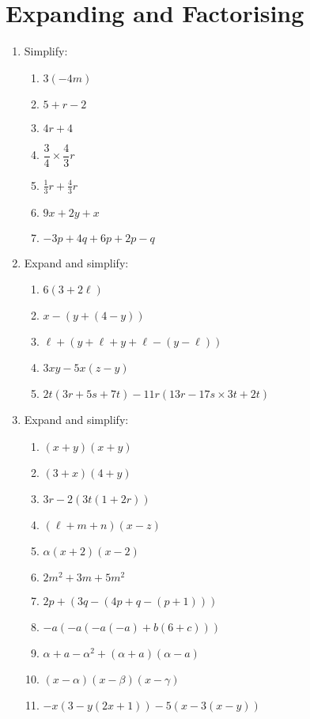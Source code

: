 \documentclass{amsbook}
\begin{document}
\section{Expanding and Factorising}
\begin{enumerate}
  \item Simplify:
    \begin{enumerate}
      \item $ 3(-4m) $
      \item $ 5 + r - 2 $
      \item $ 4r + 4 $
      \item $ \dfrac{3}{4} \times \dfrac{4}{3} r $
      \item $ \frac{1}{3} r + \frac{4}{3} r $
      \item $ 9x + 2y + x $
      \item $ -3p + 4q + 6p + 2p - q $
    \end{enumerate}
  \item Expand and simplify:
    \begin{enumerate}
      \item $ 6(3 + 2\ell) $
      \item $ x - (y + (4 - y)) $
      \item $ \ell + (y + \ell + y + \ell - (y - \ell)) $
      \item $ 3xy - 5x(z - y) $
      \item $ 2t(3r + 5s + 7t) - 11r(13r - 17s \times 3t + 2t) $
    \end{enumerate}
  \item Expand and simplify:
    \begin{enumerate}
      \item $ (x + y)(x + y) $
      \item $ (3 + x)(4 + y) $
      \item $ 3r - 2(3t(1 + 2r)) $
      \item $ (\ell + m + n)(x - z) $
      \item $ \alpha(x + 2)(x - 2) $
      \item $ 2m^2 + 3m + 5m^2 $
      \item $ 2p + (3q - (4p + q - (p + 1))) $
      \item $ -a(-a(-a(-a) + b(6 + c))) $
      \item $ \alpha + a - \alpha^2 + (\alpha + a)(\alpha - a) $
      \item $ (x - \alpha)(x - \beta)(x - \gamma) $
      \item $ -x(3 - y(2x + 1)) - 5(x - 3(x - y)) $

\end{enumerate}
\end{enumerate}
\end{document}
